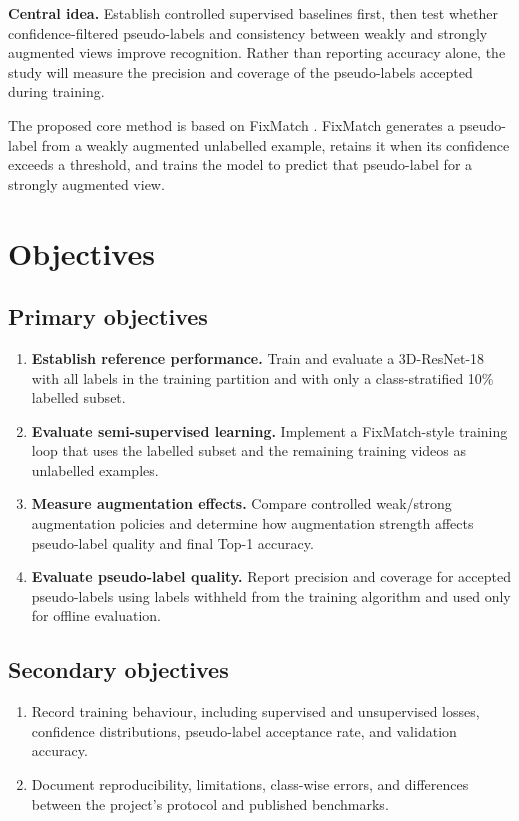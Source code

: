 \documentclass[11pt,a4paper]{article}
\begin{document}
\begin{keybox}
\textbf{Central idea.} Establish controlled supervised baselines first, then test whether confidence-filtered pseudo-labels and consistency between weakly and strongly augmented views improve recognition. Rather than reporting accuracy alone, the study will measure the precision and coverage of the pseudo-labels accepted during training.
\end{keybox}

The proposed core method is based on FixMatch \cite{fixmatch}. FixMatch generates a pseudo-label from a weakly augmented unlabelled example, retains it when its confidence exceeds a threshold, and trains the model to predict that pseudo-label for a strongly augmented view.



\section{Objectives}
\subsection{Primary objectives}
\begin{enumerate}[label=\textbf{O\arabic*.}]
  \item \textbf{Establish reference performance.} Train and evaluate a 3D-ResNet-18 with all labels in the training partition and with only a class-stratified 10\% labelled subset.
  \item \textbf{Evaluate semi-supervised learning.} Implement a FixMatch-style training loop that uses the labelled subset and the remaining training videos as unlabelled examples.
  \item \textbf{Measure augmentation effects.} Compare controlled weak/strong augmentation policies and determine how augmentation strength affects pseudo-label quality and final Top-1 accuracy.
  \item \textbf{Evaluate pseudo-label quality.} Report precision and coverage for accepted pseudo-labels using labels withheld from the training algorithm and used only for offline evaluation.
\end{enumerate}

\subsection{Secondary objectives}
\begin{enumerate}[label=\textbf{O\arabic*.},start=5]
  \item Record training behaviour, including supervised and unsupervised losses, confidence distributions, pseudo-label acceptance rate, and validation accuracy.
  \item Document reproducibility, limitations, class-wise errors, and differences between the project's protocol and published benchmarks.
\end{enumerate}
\end{document}
